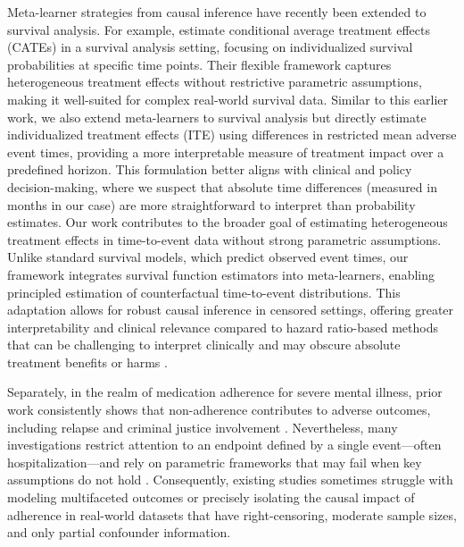Meta-learner strategies from causal inference \citep{kunzel2019metalearners} have recently been extended to survival analysis.
For example, \citet{bo2024meta} estimate conditional average treatment effects (CATEs) in a survival analysis setting, focusing on individualized survival probabilities at specific time points.
Their flexible framework captures heterogeneous treatment effects without restrictive parametric assumptions, making it well-suited for complex real-world survival data.
Similar to this earlier work, we also extend meta-learners to survival analysis but directly estimate individualized treatment effects (ITE) using differences in restricted mean adverse event times, providing a more interpretable measure of treatment impact over a predefined horizon.
This formulation better aligns with clinical and policy decision-making, where we suspect that absolute time differences (measured in months in our case) are more straightforward to interpret than probability estimates. 
Our work contributes to the broader goal of estimating heterogeneous treatment effects in time-to-event data without strong parametric assumptions.
Unlike standard survival models, which predict observed event times, our framework integrates survival function estimators into meta-learners, enabling principled estimation of counterfactual time-to-event distributions.
This adaptation allows for robust causal inference in censored settings, offering greater interpretability and clinical relevance compared to hazard ratio-based methods that can be challenging to interpret clinically and may obscure absolute treatment benefits or harms \citep{hernan2010hazards, aalen2015does}.

Separately, in the realm of medication adherence for severe mental illness, prior work consistently shows that non-adherence contributes to adverse outcomes, including relapse and criminal justice involvement \citep{semahegn2020psychotropic, lin2022time, correll2018comparison}.
Nevertheless, many investigations restrict attention to an endpoint defined by a single event---often hospitalization---and rely on parametric frameworks that may fail when key assumptions do not hold \citep{campos2021measuring, tannous2024predictive}.
Consequently, existing studies sometimes struggle with modeling multifaceted outcomes or precisely isolating the causal impact of adherence in real-world datasets that have right-censoring, moderate sample sizes, and only partial confounder information.

